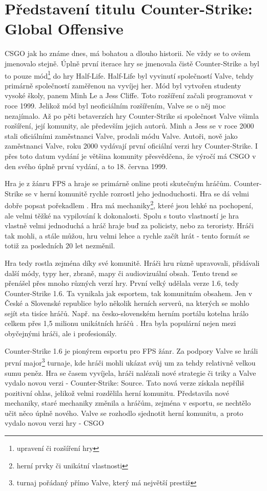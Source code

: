 \section{Představení titulu Counter-Strike: Global Offensive}
\ac{CSGO} jak ho známe dnes, má bohatou a dlouho historii. Ne vždy se to ovšem jmenovalo stejně. Úplně první iterace hry se jmenovala čistě Counter-Strike a byl to pouze
mód\footnote{upravení či rozšíření hry} do hry Half-Life. Half-Life byl vyvinutí společností Valve, tehdy primárně společností zaměřenou na vyvíjej her. Mód byl
vytvořen studenty vysoké školy, panem Minh Le a Jess Cliffe. Toto rozšíření začali programovat v roce 1999. Jelikož mód byl neoficiálním rozšířením, Valve se o
něj moc nezajímalo. Až po pěti betaverzích hry Counter-Strike si společnost Valve všimla rozšíření, její komunity, ale především jejich autorů. Minh a Jess se v roce 2000
stali oficiálními zaměstnanci Valve, prodali  módu Valve. Autoři, nově jako zaměstnanci Valve, roku 2000 vydávají první oficiální verzi hry Counter-Strike.
 I přes toto  datum vydání je většina komunity přesvědčena, že výročí má \ac{CSGO} v den svého úplně první vydání, a to 18. června 1999.

Hra je z žánru \ac{FPS} a hraje se primárně online proti skutečným hráčům. Counter-Strike se v herní komunitě rychle rozrostl jeho jednoduchosti.
Hra se dá velmi dobře popsat pořekadlem . Hra má mechaniky\footnote{herní prvky či unikátní vlastnosti},
které jsou lehké na pochopení, ale velmi těžké na vypilování k dokonalosti. Spolu s touto vlastností je hra vlastně velmi jednoduchá a hráč hraje buď za policisty, nebo za
teroristy. Hráči tak mohli, a stále můžou, hru velmi lehce a rychle začít hrát - tento formát se totiž za posledních 20 let nezměnil. 

Hra tedy rostla zejména díky své komunitě. Hráči hru různě upravovali, přidávali další módy, typy her, zbraně, mapy či audiovizuální obsah. Tento trend se přenášel přes
mnoho různých verzí hry. První velký  udělala verze 1.6, tedy Counter-Strike 1.6. Ta vynikala jak esportem, tak komunitním obsahem. Jen v České a
Slovenské republice bylo několik herních serverů, na kterých se mohlo sejít sta tisíce hráčů. Např. na česko-slovenském herním portálu kotelna hrálo celkem přes
1,5 milionu unikátních hráčů \cite{csko2021}. Hra byla populární nejen mezi obyčejnými hráči, ale i profesionály.

Counter-Strike 1.6 je pionýrem esportu pro \ac{FPS} žánr. Za podpory Valve se hráli první major\footnote{turnaj pořádaný přímo Valve, který má největší prestiž} turnaje,
kde hráči mohli ukázat svůj um za tehdy relativně velkou sumu peněz. Hra se časem vyvíjela, hráči nalézali nové strategie či triky a Valve vydalo novou verzi - Counter-Strike:
Source. Tato nová verze získala nepříliš pozitivní ohlas, jelikož velmi rozdělila herní komunitu. Představila nové mechaniky, staré mechaniky změnila a hráčům, zejména v esportu,
se nechtělo učit něco úplně nového. Valve se rozhodlo sjednotit herní komunitu, a proto vydalo novou verzi hry - \ac{CSGO}

